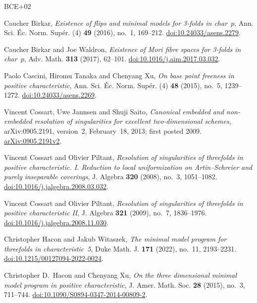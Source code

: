 \begin{thebibliography}{BCE+02}
\small
\setlength{\itemsep}{3pt}
\setlength{\parsep}{0pt}

Caucher Birkar, \emph{Existence of flips and minimal models for 3-folds in char~$p$},
Ann. Sci. \'Ec. Norm. Sup\'er. (4) \textbf{49} (2016), no.~1, 169--212.
\href{https://doi.org/10.24033/asens.2279}{doi:10.24033/asens.2279}.

Caucher Birkar and Joe Waldron,
\emph{Existence of Mori fibre spaces for 3-folds in char~$p$},
Adv. Math. \textbf{313} (2017), 62--101.
\href{https://doi.org/10.1016/j.aim.2017.03.032}{doi:10.1016/j.aim.2017.03.032}.

Paolo Cascini, Hiromu Tanaka and Chenyang Xu,
\emph{On base point freeness in positive characteristic},
Ann. Sci. \'Ec. Norm. Sup\'er. (4) \textbf{48} (2015), no.~5, 1239--1272.
\href{https://doi.org/10.24033/asens.2269}{doi:10.24033/asens.2269}.

Vincent Cossart, Uwe Jannsen and Shuji Saito,
\emph{Canonical embedded and non-embedded resolution of singularities for excellent two-dimensional schemes},
arXiv:0905.2191, version~2, February~18, 2013; first posted 2009.
\href{https://arxiv.org/abs/0905.2191v2}{arXiv:0905.2191v2}.

Vincent Cossart and Olivier Piltant,
\emph{Resolution of singularities of threefolds in positive characteristic. I. Reduction to local uniformization on Artin--Schreier and purely inseparable coverings},
J. Algebra \textbf{320} (2008), no.~3, 1051--1082.
\href{https://doi.org/10.1016/j.jalgebra.2008.03.032}{doi:10.1016/j.jalgebra.2008.03.032}.

Vincent Cossart and Olivier Piltant,
\emph{Resolution of singularities of threefolds in positive characteristic II},
J. Algebra \textbf{321} (2009), no.~7, 1836--1976.
\href{https://doi.org/10.1016/j.jalgebra.2008.11.030}{doi:10.1016/j.jalgebra.2008.11.030}.

Christopher Hacon and Jakub Witaszek,
\emph{The minimal model program for threefolds in characteristic~5},
Duke Math. J. \textbf{171} (2022), no.~11, 2193--2231.
\href{https://doi.org/10.1215/00127094-2022-0024}{doi:10.1215/00127094-2022-0024}.

Christopher D.~Hacon and Chenyang Xu,
\emph{On the three dimensional minimal model program in positive characteristic},
J. Amer. Math. Soc. \textbf{28} (2015), no.~3, 711--744.
\href{https://doi.org/10.1090/S0894-0347-2014-00809-2}{doi:10.1090/S0894-0347-2014-00809-2}.


\end{thebibliography}
